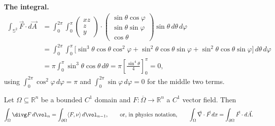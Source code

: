 \begin{example}
\textbf{The integral.}
\[
\begin{aligned}
\int_{\mathbb{S}^2} \vec F\cdot d\vec A
  &= \int_0^{2\pi}\!\!\int_0^\pi \begin{pmatrix}xz\\ z\\ y\end{pmatrix}\cdot
     \begin{pmatrix}\sin\theta\cos\varphi\\ \sin\theta\sin\varphi\\ \cos\theta\end{pmatrix}
     \sin\theta\,d\theta\,d\varphi \\
  &= \int_0^{2\pi}\!\!\int_0^\pi \Big[\sin^3\theta\cos\theta\cos^2\varphi
     + \sin^2\theta\cos\theta\sin\varphi + \sin^2\theta\cos\theta\sin\varphi\Big]\,d\theta\,
     d\varphi \\
  &= \pi\int_0^\pi \sin^3\theta\cos\theta\,d\theta
   = \pi\left[\frac{\sin^4\theta}{4}\right]_0^\pi = 0,
\end{aligned}
\]
using $\int_0^{2\pi}\cos^2\varphi\,d\varphi = \pi$ and $\int_0^{2\pi}\sin\varphi\,d\varphi=0$
for the middle two terms.
\end{example}

\begin{theorem}[Gauss]
\label{thm:gauss_divergence}
Let $\Omega \subseteq \mathbb{R}^n$ be a bounded $C^1$ domain and $F : \overline\Omega \to
\mathbb{R}^n$ a $C^1$ vector field. Then
\[\int_\Omega \divg F\,d\vol_n = \int_{\partial\Omega} \langle F,\nu\rangle\,d\vol_{n-1},
  \qquad \text{or, in physics notation,} \qquad
  \int_\Omega \vec\nabla\cdot\vec F\,dx = \int_{\partial\Omega} \vec F\cdot d\vec A.\]
\end{theorem}

